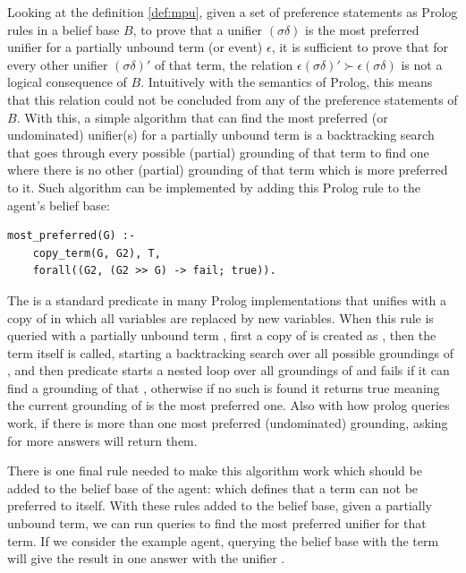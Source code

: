 Looking at the definition \ref{def:mpu}, given a set of preference statements as Prolog rules in a belief base $B$, to prove that a unifier $(\sigma\delta)$ is the most preferred unifier for a partially unbound term (or event) $\epsilon$, it is sufficient to prove that for every other unifier $(\sigma\delta)'$ of that term, the relation $\epsilon(\sigma\delta)' \succ \epsilon(\sigma\delta)$ is not a logical consequence of $B$. Intuitively with the semantics of Prolog, this means that this relation could not be concluded from any of the preference statements of $B$. With this, a simple algorithm that can find the most preferred (or undominated) unifier(s) for a partially unbound term is a backtracking search that goes through every possible (partial) grounding of that term to find one where there is no other (partial) grounding of that term which is more preferred to it. Such algorithm can be implemented by adding this Prolog rule to the agent's belief base: 
\begin{verbatim}
most_preferred(G) :- 
    copy_term(G, G2), T, 
    forall((G2, (G2 >> G) -> fail; true)).
\end{verbatim}
The  is a standard predicate in many Prolog implementations that unifies  with a copy of  in which all variables are replaced by new variables. 
When this rule is queried with a partially unbound term , first a copy of  is created as , then the term  itself is called, starting a backtracking search over all possible groundings of , and then  predicate starts a nested loop over all groundings of  and fails if it can find a grounding of  that , otherwise if no such  is found it returns true meaning the current grounding of  is the most preferred one. Also with how prolog queries work, if there is more than one most preferred (undominated) grounding, asking for more answers will return them.

There is one final rule needed to make this algorithm work which should be added to the belief base of the agent:  which defines that a term can not be preferred to itself. With these rules added to the belief base, given a partially unbound term, we can run queries to find the most preferred unifier for that term. If we consider the example agent, querying the belief base with the term  will give the result in one answer with the unifier . 

